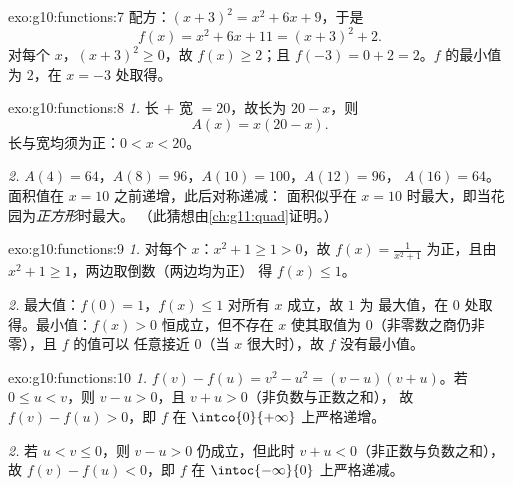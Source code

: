 \begin{solution}{exo:g10:functions:7}
配方：$(x+3)^2 = x^2 + 6x + 9$，于是
\[
f(x) = x^2 + 6x + 11 = (x + 3)^2 + 2 .
\]
对每个 $x$，$(x+3)^2 \geq 0$，故 $f(x) \geq 2$；且
$f(-3) = 0 + 2 = 2$。$f$ 的最小值为 $2$，在 $x = -3$ 处取得。
\end{solution}

\begin{solution}{exo:g10:functions:8}
\emph{1.} 长 $+$ 宽 $= 20$，故长为 $20 - x$，则
\[
A(x) = x(20 - x).
\]
长与宽均须为正：$0 < x < 20$。

\emph{2.} $A(4) = 64$，$A(8) = 96$，$A(10) = 100$，$A(12) = 96$，
$A(16) = 64$。面积值在 $x = 10$ 之前递增，此后对称递减：
面积似乎在 $x = 10$ 时最大，即当花园为\emph{正方形}时最大。
（此猜想由\cref{ch:g11:quad}证明。）
\end{solution}

\begin{solution}{exo:g10:functions:9}
\emph{1.} 对每个 $x$：$x^2 + 1 \geq 1 > 0$，故 $f(x) = \frac{1}{x^2+1}$
为正，且由 $x^2 + 1 \geq 1$，两边取倒数（两边均为正）
得 $f(x) \leq 1$。

\emph{2.} 最大值：$f(0) = 1$，$f(x) \leq 1$ 对所有 $x$ 成立，故 $1$ 为
最大值，在 $0$ 处取得。最小值：$f(x) > 0$ 恒成立，但不存在 $x$
使其取值为 $0$（非零数之商仍非零），且 $f$ 的值可以
任意接近 $0$（当 $x$ 很大时），故 $f$ 没有最小值。
\end{solution}

\begin{solution}{exo:g10:functions:10}
\emph{1.} $f(v) - f(u) = v^2 - u^2 = (v-u)(v+u)$。若 $0 \leq u < v$，则
$v - u > 0$，且 $v + u > 0$（非负数与正数之和），
故 $f(v) - f(u) > 0$，即 $f$ 在 $\intco{0}{+\infty}$ 上严格递增。

\emph{2.} 若 $u < v \leq 0$，则 $v - u > 0$ 仍成立，但此时
$v + u < 0$（非正数与负数之和），故
$f(v) - f(u) < 0$，即 $f$ 在 $\intoc{-\infty}{0}$ 上严格递减。
\end{solution}

